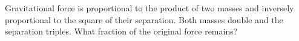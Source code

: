 Gravitational force is proportional to the product of two masses and inversely proportional to the square of their separation. Both masses double and the separation triples. What fraction of the original force remains?

